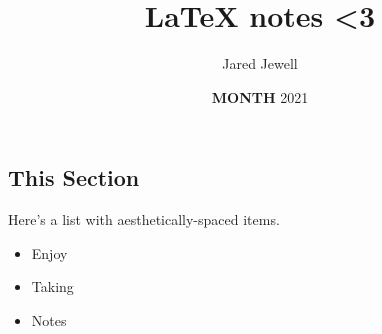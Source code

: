 \documentclass[12pt]{article}
\begin{document}
    \title{\LaTeX{} notes <3}
    \author{Jared Jewell}
    \date{\textbf{MONTH} 2021}
    \maketitle
    
\subsection*{This Section}
Here's a list with aesthetically-spaced items.

\vspace{-2mm}
\begin{itemize} \setlength\itemsep{-0.2em}
    \item Enjoy
    \item Taking
    \item Notes
\end{itemize}
\end{document}
